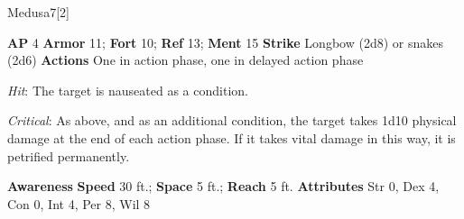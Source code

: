 \begin{monsection}{Medusa}{7}[2]
\vspace{-1em}\vspace{-1em}
\begin{spellcontent}
\begin{spelltargetinginfo}
{\textbf{AP} 4}
\pari \textbf{Armor} 11;
\textbf{Fort} 10;
\textbf{Ref} 13;
\textbf{Ment} 15
\pari \textbf{Strike} Longbow  (2d8) or snakes  (2d6)
\pari \textbf{Actions} One in action phase, one in delayed action phase
\end{spelltargetinginfo}
\begin{spelleffects}
\pari
{}
\par
\par \textit{Hit}: The target is nauseated as a condition.
\par \textit{Critical}:
As above, and as an additional condition, the target takes 1d10 physical damage at the end of each action phase.
If it takes vital damage in this way, it is petrified permanently.
\end{spelleffects}
\end{spellcontent}
\begin{spellsubcontent}
\begin{spellfooter}
\pari \textbf{Awareness} 
\pari \textbf{Speed} 30 ft.;
\textbf{Space} 5 ft.;
\textbf{Reach} 5 ft.
\pari \textbf{Attributes}
Str 0,
Dex 4,
Con 0,
Int 4,
Per 8,
Wil 8
\end{spellfooter}
\end{spellsubcontent}
\end{monsection}
